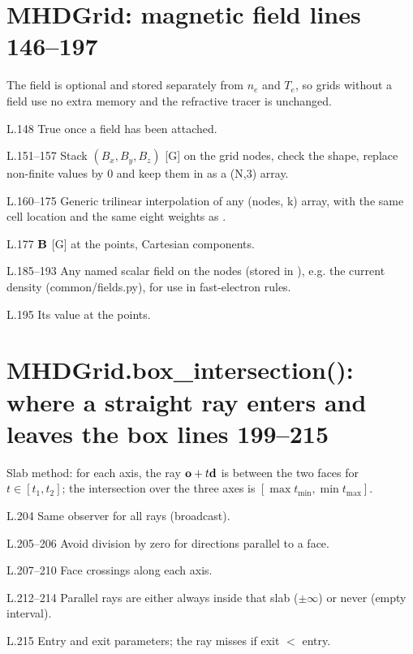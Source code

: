 \section*{\normalsize MHDGrid: magnetic field \hfill{\small\mdseries\color{gray}lines 146--197}}

The field is optional and stored separately from $n_e$ and $T_e$, so grids without a field use no extra memory and the refractive tracer is unchanged.

\begin{lines}
\item[L.148] True once a field has been attached.
\item[L.151–157] Stack $(B_x,B_y,B_z)$ [G] on the grid nodes, check the shape, replace non-finite values by 0 and keep them in  as a (N,3) array.
\item[L.160–175] Generic trilinear interpolation of any (nodes, k) array, with the same cell location and the same eight weights as .
\item[L.177] $\mathbf{B}$ [G] at the points, Cartesian components.
\item[L.185–193] Any named scalar field on the nodes (stored in ), e.g. the current density  (common/fields.py), for use in fast-electron rules.
\item[L.195] Its value at the points.
\end{lines}
\section*{\normalsize MHDGrid.box\_intersection(): where a straight ray enters and leaves the box \hfill{\small\mdseries\color{gray}lines 199--215}}

Slab method: for each axis, the ray $\mathbf{o}+t\mathbf{d}$ is between the two faces for $t\in[t_1,t_2]$; the intersection over the three axes is $[\max t_\text{min},\min t_\text{max}]$.

\begin{lines}
\item[L.204] Same observer for all rays (broadcast).
\item[L.205–206] Avoid division by zero for directions parallel to a face.
\item[L.207–210] Face crossings along each axis.
\item[L.212–214] Parallel rays are either always inside that slab ($\pm\infty$) or never (empty interval).
\item[L.215] Entry and exit parameters; the ray misses if exit $<$ entry.
\end{lines}

